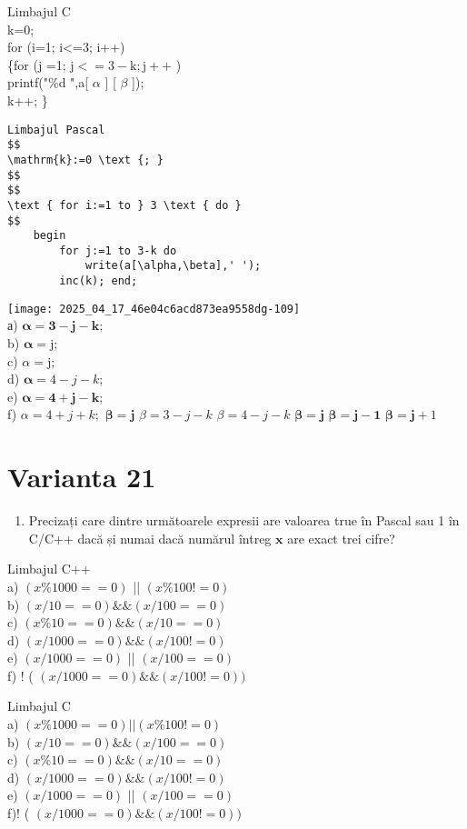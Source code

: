 Limbajul C\\
k=0;\\
for (i=1; i<=3; i++)\\
\{for (j =1; $\mathrm{j}<=3-\mathrm{k} ; \mathrm{j}++$ )\\
printf("\%d ",a[ $\alpha$ ] [ $\beta$ ]);\\
k++; \}

\begin{verbatim}
Limbajul Pascal
$$
\mathrm{k}:=0 \text {; }
$$
$$
\text { for i:=1 to } 3 \text { do }
$$
    begin
        for j:=1 to 3-k do
            write(a[\alpha,\beta],' ');
        inc(k); end;
\end{verbatim}

\texttt{[image: 2025\_04\_17\_46e04c6acd873ea9558dg-109]}\\
а) $\boldsymbol{\alpha}=\mathbf{3}-\mathbf{j}-\mathbf{k}$;\\
b) $\boldsymbol{\alpha}=\mathrm{j}$;\\
c) $\alpha=\mathrm{j}$;\\
d) $\boldsymbol{\alpha}=4-j-k$;\\
e) $\boldsymbol{\alpha}=\mathbf{4}+\mathbf{j}-\mathbf{k}$;\\
f) $\alpha=4+j+k ;$ $\boldsymbol{\beta}=\mathbf{j}$ $\beta=3-j-k$ $\beta=4-j-k$ $\boldsymbol{\beta}=\mathbf{j}$ $\boldsymbol{\beta}=\mathbf{j}-\mathbf{1}$ $\boldsymbol{\beta}=\mathbf{j}+1$

\section*{Varianta 21}
\begin{enumerate}
  \item Precizați care dintre următoarele expresii are valoarea true în Pascal sau 1 în C/C++ dacă și numai dacă numărul întreg $\mathbf{x}$ are exact trei cifre?
\end{enumerate}

Limbajul C++\\
a) $(x \% 1000==0)$ || $(x \% 100!=0)$\\
b) $(x / 10==0) \& \&(x / 100==0)$\\
c) $(x \% 10==0) \& \&(x / 10==0)$\\
d) $(x / 1000==0) \& \&(x / 100!=0)$\\
e) $(x / 1000==0)$ || $(x / 100==0)$\\
f) ! ( $(x / 1000==0) \& \&(x / 100!=0))$

Limbajul C\\
a) $(x \% 1000==0)|\mid(x \% 100!=0)$\\
b) $(x / 10==0) \& \&(x / 100==0)$\\
c) $(x \% 10==0) \& \&(x / 10==0)$\\
d) $(x / 1000==0) \& \&(x / 100!=0)$\\
e) $(x / 1000==0)$ || $(x / 100==0)$\\
f)! ( $(x / 1000==0) \& \&(x / 100!=0))$

